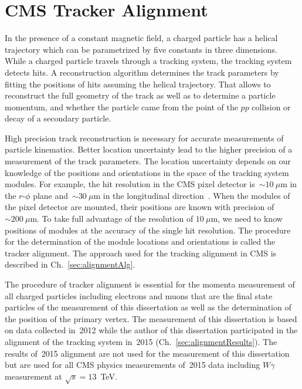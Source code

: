 \chapter{CMS Tracker Alignment} %
\label{sec:alignment}

In the presence of a constant magnetic field, a charged particle has a helical trajectory which can be parametrized by five constants in three dimensions. While a charged particle travels through a tracking system, the tracking system detects hits. A reconstruction algorithm determines the track parameters by fitting the positions of hits assuming the helical trajectory. That allows to reconstruct the full geometry of the track as well as to determine a particle momentum, and whether the particle came from the point of the $pp$ collision or decay of a secondary particle.

High precision track reconstruction is necessary for accurate measurements of particle kinematics. Better location uncertainty lead to the higher precision of a measurement of the track parameters. The location uncertainty depends on our knowledge of the positions and orientations in the space of the tracking system modules. For example, the hit resolution in the CMS pixel detector is~$\sim10~\mu$m in the $r$-$\phi$ plane and~$\sim30~\mu$m in the longitudinal direction~\cite{ref_trackerPerformance}. When the modules of the pixel detector are mounted, their positions are known with precision of~$\sim200~\mu$m. To take full advantage of the resolution of $10~\mu$m, we need to know positions of modules at the accuracy of the single hit resolution. The procedure for the determination of the module locations and orientations is called the tracker alignment. The approach used for the tracking alignment in CMS is described in Ch.~\ref{sec:alignmentAlg}.

The procedure of tracker alignment is essential for the momenta measurement of all charged particles including electrons and muons that are the final state particles of the measurement of this dissertation as well as the determination of the position of the primary vertex. The measurement of this dissertation is based on data collected in~2012 while the author of this dissertation participated in the alignment of the tracking system in~2015 (Ch.~\ref{sec:alignmentResults}). The results of~2015 alignment are not used for the measurement of this dissertation but are used for all CMS physics measurements of~2015 data including $W\gamma$ measurement at $\sqrt{s}=13$~TeV. 


